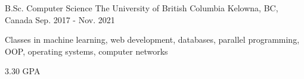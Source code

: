 

\begin{cventries}

  \cventry
    {B.Sc. Computer Science} %
    {The University of British Columbia} %
    {Kelowna, BC, Canada} %
    {Sep. 2017 - Nov. 2021} %
    {
      \begin{cvitems} %
        \item 
        {
            Classes in machine learning, web development, databases,
            parallel programming, OOP, operating systems, computer networks
        }
        \item
        {
            3.30 GPA 
        }
      \end{cvitems}
    }

\end{cventries}
